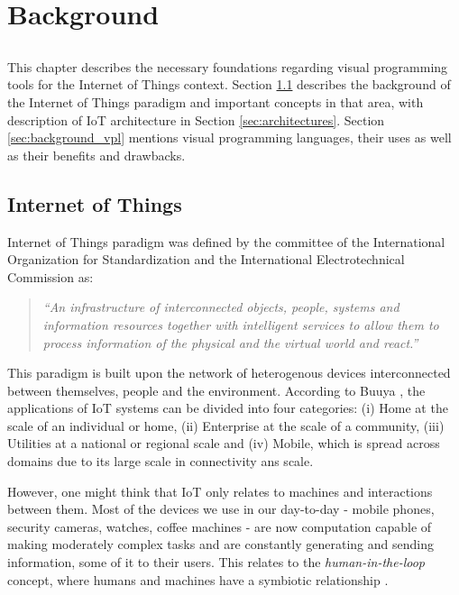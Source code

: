 \chapter{Background} \label{chap:background}

\section*{}


This chapter describes the necessary foundations regarding visual programming tools for the Internet of Things context. Section \ref{sec:background_iot} describes the background of the Internet of Things paradigm and important concepts in that area, with description of IoT architecture in Section \ref{sec:architectures}. Section \ref{sec:background_vpl} mentions visual programming languages, their uses as well as their benefits and drawbacks.

\section{Internet of Things}\label{sec:background_iot}

Internet of Things paradigm was defined by the committee of the International Organization for Standardization and the International Electrotechnical Commission \cite{ISOIEC} as:
\begin{quote}
    \emph{“An infrastructure of interconnected objects, people, systems and information resources together with intelligent services to allow them to process information of the physical and the virtual world and react.”}
\end{quote}
\par This paradigm is built upon the network of heterogenous devices interconnected between themselves, people and the environment. According to Buuya \cite{iot_future_direction}, the applications of IoT systems can be divided into four categories: (i) Home at the scale of an individual or home, (ii) Enterprise at the scale of a community, (iii) Utilities at a national or regional scale and (iv) Mobile, which is spread across domains due to its large scale in connectivity ans scale. 
\par However, one might think that IoT only relates to machines and interactions between them. Most of the devices we use in our day-to-day - mobile phones, security cameras, watches, coffee machines - are now computation capable of making moderately complex tasks and are constantly generating and sending information, some of it to their users. This relates to the \emph{human-in-the-loop} concept, where humans and machines have a symbiotic relationship \cite{human_in_the_loop_survey}.
 
